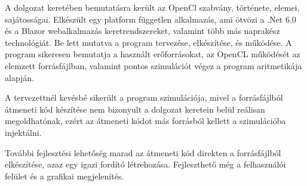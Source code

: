 
A dolgozat keretében bemutatásra került az OpenCl szabvány, története, elemei, sajátosságai.
Elkészült egy platform független alkalmazás, ami ötvözi a .Net 6.0 és a Blazor webalkalmazás keretrendszereket, valamint több más naprakész technológiát. Be lett mutatva a program tervezése, elkészítése, és működése. A program sikeresen bemutatja a használt erőforrásokat, az OpenCL működését az elemzett forrásfájlban, valamint pontos szimulációt végez a program aritmetikája alapján.

A tervezettnél kevésbé sikerült a program szimulációja, mivel a forrásfájlból átmeneti kód készítése nem bizonyult a dolgozat keretein belül reálisan megoldhatónak, ezért az átmeneti kódot más forrásból kellett a szimulációba injektálni.

További fejlesztési lehetőség  marad az átmeneti kód direkten a forrásfájlból elkészítése, azaz egy igazi fordító létrehozása. Fejleszthető még a felhasználói felület és a grafikai megjelenítés.

